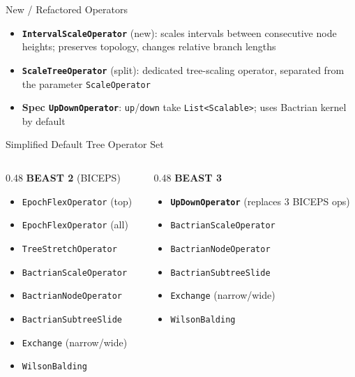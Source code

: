 \documentclass[aspectratio=169,11pt]{beamer}
\newcommand{\code}[1]{\texttt{#1}}
\begin{document}
\begin{frame}{New / Refactored Operators}
\begin{itemize}
\item \textbf{\code{IntervalScaleOperator}} (new): scales intervals between consecutive node heights; preserves topology, changes relative branch lengths
\item \textbf{\code{ScaleTreeOperator}} (split): dedicated tree-scaling operator, separated from the parameter \code{ScaleOperator}
\item \textbf{Spec \code{UpDownOperator}}: \code{up}/\code{down} take \code{List<Scalable>}; uses Bactrian kernel by default
\end{itemize}
\end{frame}

\begin{frame}{Simplified Default Tree Operator Set}
\begin{columns}[T]
\begin{column}{0.48\textwidth}
\textbf{BEAST 2} (BICEPS)
\begin{itemize}
\item \code{EpochFlexOperator} (top)
\item \code{EpochFlexOperator} (all)
\item \code{TreeStretchOperator}
\item \code{BactrianScaleOperator}
\item \code{BactrianNodeOperator}
\item \code{BactrianSubtreeSlide}
\item \code{Exchange} (narrow/wide)
\item \code{WilsonBalding}
\end{itemize}
\end{column}
\begin{column}{0.48\textwidth}
\textbf{BEAST 3}
\begin{itemize}
\item \textbf{\code{UpDownOperator}} (replaces 3 BICEPS ops)
\item \code{BactrianScaleOperator}
\item \code{BactrianNodeOperator}
\item \code{BactrianSubtreeSlide}
\item \code{Exchange} (narrow/wide)
\item \code{WilsonBalding}
\end{itemize}
\end{column}
\end{columns}
\end{frame}
\end{document}
